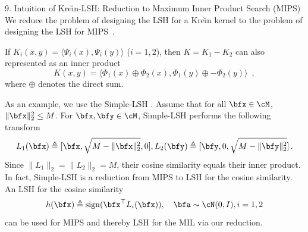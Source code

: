 \documentclass[final]{beamer}
\newcommand{\kr}{Kre\u{\i}n\xspace}
\DeclareMathOperator{\sech}{sech}
\DeclareMathOperator{\sign}{sign}
\newcommand{\ie}{\emph{i.e.}\xspace}
\newcommand{\splsh}{\textsf{Simple-LSH}\xspace}
\newlength{\onecolwid}
\begin{document}
\begin{frame}[t]
\begin{columns}[t]
\begin{column}{\onecolwid}
\begin{block}{9. Intuition of \kr-LSH: Reduction to Maximum Inner Product Search (MIPS)}
 		We reduce the problem of designing the LSH for a \kr kernel to 
 		the problem of designing the LSH for MIPS~\citep{shrivastava2014asymmetric}.
 		
 		
 		 If 
 		$ K_i(x,y)=\langle 
 		\Psi_i(x),\Psi_i(y)\rangle $ ($i=1,2$),
 		then $ K = K_1-K_2 $ can also represented as an inner product 
 		\begin{equation}\label{eq:krein_inner_product}
 		K(x,y)=\langle \Phi_1(x)\oplus \Phi_2(x), \Phi_1(y)\oplus 
 		-\Phi_2(y)\rangle\enspace,
 		\end{equation}
 		where $ \oplus $ denotes the direct sum. 
 		

		As an example,  
		we use the \splsh 
		\citep{neyshabur2015symmetric}. 
		Assume 
        that 
		for all 
		$ 
		\bfx\in \cM $, 
		$ 
		\|\bfx 
		\|^2_2\le M $.  
		For $ \bfx,\bfy\in \cM $, \splsh performs the following 
		transform \[
		L_1(\bfx) \triangleq{} 
		[\bfx,\sqrt{M-\|\bfx\|^2_2},0], L_2(\bfy) \triangleq{} 
		[\bfy,0,\sqrt{M-\|\bfy\|^2_2}]\,.\]
		Since 
		$\|L_1\|_2 = \|L_2\|_2 = M$,
		their cosine similarity equals their inner product. 
		In fact, \splsh is a reduction from MIPS to LSH for the cosine 
		similarity. An 
		LSH for the cosine 
		similarity~\citep{charikar2002similarity} \[ 
		h(\bfx)\triangleq \sign(\bfx^\top L_i(\bfx)),\quad \bfa\sim \cN(0, I), 
		i=1,2
		\]
		can be used for MIPS and thereby LSH for the MIL  via our 
		reduction.
		

\end{block}
\end{column}
\end{columns}
\end{frame}
\end{document}
